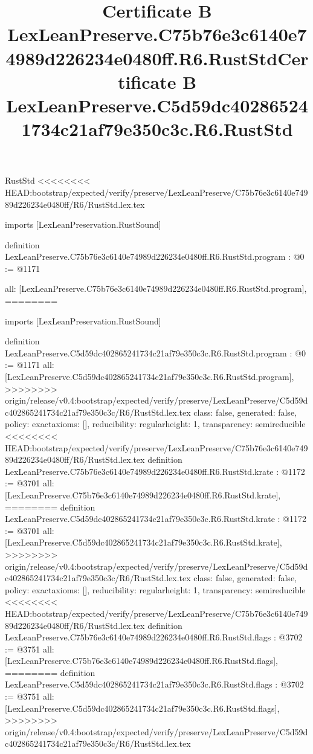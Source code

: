 \begin{lexlean}{RustStd}
<<<<<<<< HEAD:bootstrap/expected/verify/preserve/LexLeanPreserve/C75b76e3c6140e74989d226234e0480ff/R6/RustStd.lex.tex
\title{Certificate B LexLeanPreserve.C75b76e3c6140e74989d226234e0480ff.R6.RustStd}
\begin{coremodule}
imports [LexLeanPreservation.RustSound]

definition LexLeanPreserve.C75b76e3c6140e74989d226234e0480ff.R6.RustStd.program : @0 := @1171 {
  all: [LexLeanPreserve.C75b76e3c6140e74989d226234e0480ff.R6.RustStd.program],
========
\title{Certificate B LexLeanPreserve.C5d59dc402865241734c21af79e350c3c.R6.RustStd}
\begin{coremodule}
imports [LexLeanPreservation.RustSound]

definition LexLeanPreserve.C5d59dc402865241734c21af79e350c3c.R6.RustStd.program : @0 := @1171 {
  all: [LexLeanPreserve.C5d59dc402865241734c21af79e350c3c.R6.RustStd.program],
>>>>>>>> origin/release/v0.4:bootstrap/expected/verify/preserve/LexLeanPreserve/C5d59dc402865241734c21af79e350c3c/R6/RustStd.lex.tex
  class: false,
  generated: false,
  policy: exact{axioms: []},
  reducibility: regular{height: 1},
  transparency: semireducible
}
<<<<<<<< HEAD:bootstrap/expected/verify/preserve/LexLeanPreserve/C75b76e3c6140e74989d226234e0480ff/R6/RustStd.lex.tex
definition LexLeanPreserve.C75b76e3c6140e74989d226234e0480ff.R6.RustStd.krate : @1172 := @3701 {
  all: [LexLeanPreserve.C75b76e3c6140e74989d226234e0480ff.R6.RustStd.krate],
========
definition LexLeanPreserve.C5d59dc402865241734c21af79e350c3c.R6.RustStd.krate : @1172 := @3701 {
  all: [LexLeanPreserve.C5d59dc402865241734c21af79e350c3c.R6.RustStd.krate],
>>>>>>>> origin/release/v0.4:bootstrap/expected/verify/preserve/LexLeanPreserve/C5d59dc402865241734c21af79e350c3c/R6/RustStd.lex.tex
  class: false,
  generated: false,
  policy: exact{axioms: []},
  reducibility: regular{height: 1},
  transparency: semireducible
}
<<<<<<<< HEAD:bootstrap/expected/verify/preserve/LexLeanPreserve/C75b76e3c6140e74989d226234e0480ff/R6/RustStd.lex.tex
definition LexLeanPreserve.C75b76e3c6140e74989d226234e0480ff.R6.RustStd.flags : @3702 := @3751 {
  all: [LexLeanPreserve.C75b76e3c6140e74989d226234e0480ff.R6.RustStd.flags],
========
definition LexLeanPreserve.C5d59dc402865241734c21af79e350c3c.R6.RustStd.flags : @3702 := @3751 {
  all: [LexLeanPreserve.C5d59dc402865241734c21af79e350c3c.R6.RustStd.flags],
>>>>>>>> origin/release/v0.4:bootstrap/expected/verify/preserve/LexLeanPreserve/C5d59dc402865241734c21af79e350c3c/R6/RustStd.lex.tex
}}}
\end{coremodule}}
\end{coremodule}
\end{lexlean}

